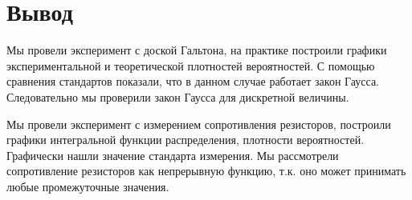 \section{Вывод}

Мы провели эксперимент с доской Гальтона, на практике построили графики экспериментальной и теоретической плотностей вероятностей. С помощью сравнения стандартов показали, что в данном случае работает закон Гаусса. Следовательно мы проверили закон Гаусса для дискретной величины. 

Мы провели эксперимент с измерением сопротивления резисторов, построили графики интегральной функции распределения, плотности вероятностей. Графически нашли значение стандарта измерения. Мы рассмотрели сопротивление резисторов как непрерывную функцию, т.к. оно может принимать любые промежуточные значения.